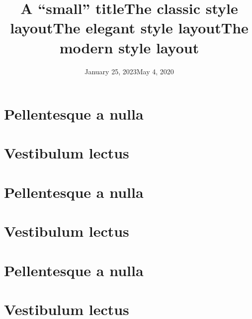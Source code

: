 \documentclass[a4paper,11pt]{article}
\begin{document}
\newpage
\hypertarget{schooldocs-example-small}{}

\selectfont
\title{A ``small'' title}
\date{January 25, 2023}
\makesmalltitle
\lipsum[1]

\newpage
\hypertarget{schooldocs-example-classic}{}

\selectfont
\setcounter{page}{1}
\pagestyle{classic}
\title[The classic style]{The classic style layout}
\date{May 4, 2020}
\maketitle
\section*{Pellentesque a nulla}
\lipsum[1-3]
\section*{Vestibulum lectus}
\lipsum[5-9]

\newpage
\hypertarget{schooldocs-example-elegant}{}

\setcounter{page}{1}
\setcounter{section}{0}
\addtolength{\headheight}{-\baselineskip}
\pagestyle{elegant}
\title[The elegant style]{The elegant style layout}
\schooldocstitles
\maketitle
\section*{Pellentesque a nulla}
\lipsum[1-3]
\section*{Vestibulum lectus}
\lipsum[5-9]

\newpage
\hypertarget{schooldocs-example-modern}{}

\setcounter{page}{1}
\setcounter{section}{0}
\renewcommand{\headrulewidth}{0.4pt}
\pagestyle{modern}
\title[The modern style]{The modern style layout}
\maketitle
\section*{Pellentesque a nulla}
\lipsum[1-3]
\section*{Vestibulum lectus}
\lipsum[5-9]
\end{document}

